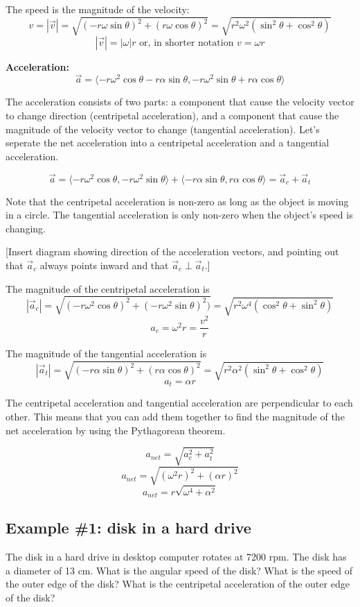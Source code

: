 The speed is the magnitude of the velocity:
$$v=|\vec{v}|=\sqrt{(-r\omega\sin\theta)^2+(r\omega\cos\theta)^2}=\sqrt{r^2\omega^2(\sin^2\theta+\cos^2\theta)}$$
$$\boxed{|\vec{v}|=|\omega| r} \mbox{ or, in shorter notation } \boxed{v=\omega r}$$

\vspace{5cm}

\textbf{Acceleration:}
$$\vec a = \langle{-r\omega^2\cos\theta-r\alpha\sin\theta,-r\omega^2\sin\theta+r\alpha\cos\theta\rangle}$$

The acceleration consists of two parts: a component that cause the velocity vector to change direction (centripetal acceleration), and a component that cause the magnitude of the velocity vector to change (tangential acceleration). Let's seperate the net acceleration into a centripetal acceleration and a tangential acceleration.

$$\vec a=\langle{-r\omega^2\cos\theta,-r\omega^2\sin\theta}\rangle+\langle{-r\alpha\sin\theta,r\alpha\cos\theta}\rangle=\vec{a}_c+\vec{a}_t$$

Note that the centripetal acceleration is non-zero as long as the object is moving in a circle. The tangential acceleration is only non-zero when the object's speed is changing.

[Insert diagram showing direction of the acceleration vectors, and pointing out that $\vec{a}_c$ always points inward and that $\vec{a}_c\perp\vec{a}_t$.]

\clearpage

The magnitude of the centripetal acceleration is
$$|\vec{a}_c|=\sqrt{(-r\omega^2\cos\theta)^2+(-r\omega^2\sin\theta)^2)}=\sqrt{r^2\omega^4(\cos^2\theta+\sin^2\theta)}$$
$$\boxed{a_c=\omega^2r=\frac{v^2}{r}}$$

The magnitude of the tangential acceleration is
$$|\vec{a}_t|=\sqrt{(-r\alpha\sin\theta)^2+(r\alpha\cos\theta)^2}=\sqrt{r^2\alpha^2(\sin^2\theta+\cos^2\theta)}$$
$$\boxed{a_t=\alpha r}$$

The centripetal acceleration and tangential acceleration are perpendicular to each other. This means that you can add them together to find the magnitude of the net acceleration by using the Pythagorean theorem.

$$a_{net}=\sqrt{a_c^2+a_t^2}$$
$$a_{net}=\sqrt{(\omega^2 r)^2+(\alpha r)^2}$$
$$\boxed{a_{net}=r\sqrt{\omega^4+\alpha^2}}$$


\subsection{Example \#1: disk in a hard drive}
The disk in a hard drive in desktop computer rotates at 7200 rpm. The disk has a diameter of 13 cm. What is the angular speed of the disk? What is the speed of the outer edge of the disk? What is the centripetal acceleration of the outer edge of the disk?

